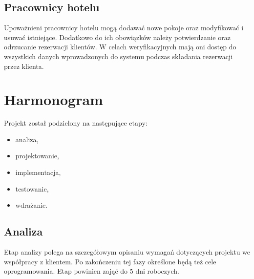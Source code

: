 \documentclass [11pt, a4paper, leqno] {article}
\begin{document}
\subsection{Pracownicy hotelu}
\noindent
Upoważnieni pracownicy hotelu mogą dodawać nowe pokoje oraz modyfikować i usuwać istniejące. Dodatkowo do ich obowiązków należy potwierdzanie oraz odrzucanie rezerwacji klientów. W celach weryfikacyjnych mają oni dostęp do wszystkich danych wprowadzonych do systemu podczas składania rezerwacji przez klienta.



\section{Harmonogram}
\noindent
Projekt został podzielony na następujące etapy:
\begin{itemize}
\item analiza,
\item projektowanie,
\item implementacja,
\item testowanie,
\item wdrażanie.
\end{itemize}

\subsection{Analiza}
\noindent
Etap analizy polega na szczegółowym opisaniu wymagań dotyczących projektu we współpracy z klientem. Po zakończeniu tej fazy określone będą też cele oprogramowania. Etap powinien zająć do 5 dni roboczych.
\end{document}
